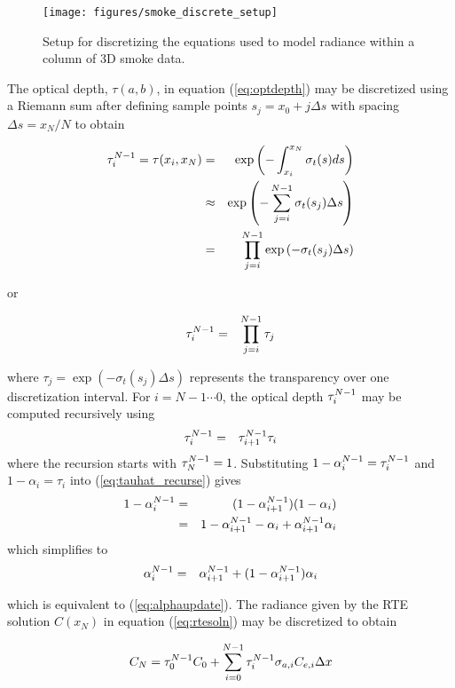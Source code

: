 \begin{figure}[\figoptions]
\begin{center}
\texttt{[image: figures/smoke\_discrete\_setup]}
\end{center}
\caption {Setup for discretizing the equations used to model
radiance within a column of 3D smoke data.}
\label{fig:smokediscretesetup}
\end{figure}

The optical depth, $\tau(a,b)$, in equation (\ref{eq:optdepth}) may be discretized using a Riemann sum  after defining sample points $s_j=x_0+j\Delta s$ with spacing $\Delta s=x_N/N$ to obtain

\begin{eqnarray*}
\tau_{i}^{N-1}=\tau(x_i,x_N)&=&\exp\left(-\int_{x_i}^{x_N}\sigma_t(s)ds\right)\\
&\approx&\exp\left(-\sum_{j=i}^{N-1}\sigma_t(s_j)\Delta s\right)\\
&=&\prod_{j=i}^{N-1}\exp\left(-\sigma_t(s_j)\Delta s\right)
\end{eqnarray*}

or

\begin{eqnarray}
\label{eq:tauhat_discrete}
\tau_{i}^{N-1}&=&\prod_{j=i}^{N-1}\tau_j
\end{eqnarray}

where $\tau_j=\exp\left(-\sigma_t(s_j)\Delta s\right)$ represents the transparency over one discretization interval.
For $i=N-1\cdots 0$, the optical depth $\tau_{i}^{N-1}$ may be computed recursively using 
\begin{eqnarray}
\label{eq:tauhat_recurse}
\tau_{i}^{N-1}&=&\tau_{i+1}^{N-1}\tau_i
\end{eqnarray}
where the recursion starts with $\tau_{N}^{N-1}=1$.
Substituting $1-\alpha_{i}^{N-1}=\tau_{i}^{N-1}$ and $1-\alpha_i=\tau_i$ into (\ref{eq:tauhat_recurse}) gives
\begin{eqnarray*}
1-\alpha_{i}^{N-1}&=&(1-\alpha_{i+1}^{N-1})(1-\alpha_i)\\
&=&1-\alpha_{i+1}^{N-1} - \alpha_i + \alpha_{i+1}^{N-1}\alpha_i
\end{eqnarray*}
which simplifies to
\begin{eqnarray*}
\alpha_{i}^{N-1}&=&\alpha_{i+1}^{N-1} + (1-\alpha_{i+1}^{N-1})\alpha_i
\end{eqnarray*}

which is equivalent to (\ref{eq:alphaupdate}).  The radiance given by the RTE solution $C(x_N)$ in equation (\ref{eq:rtesoln}) may be discretized to obtain

\begin{equation}
\label{eq:discrete_rte}
C_{N} = \tau_{0}^{N-1}C_0 +
\sum_{i=0}^{N-1}\tau_{i}^{N-1}\sigma_{a,i}C_{e,i}\Delta x
\end{equation}

